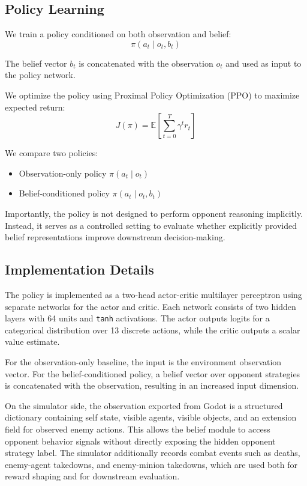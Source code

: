 \documentclass{article}
\begin{document}
\subsection{Policy Learning}

We train a policy conditioned on both observation and belief:
\[
\pi(a_t \mid o_t, b_t)
\]

The belief vector $b_t$ is concatenated with the observation $o_t$ and used as input to the policy network.

We optimize the policy using Proximal Policy Optimization (PPO) to maximize expected return:
\[
J(\pi) = \mathbb{E}\left[\sum_{t=0}^{T} \gamma^t r_t\right]
\]

We compare two policies:
\begin{itemize}
    \item Observation-only policy $\pi(a_t \mid o_t)$
    \item Belief-conditioned policy $\pi(a_t \mid o_t, b_t)$
\end{itemize}

Importantly, the policy is not designed to perform opponent reasoning implicitly. Instead, it serves as a controlled setting to evaluate whether explicitly provided belief representations improve downstream decision-making.

\subsection{Implementation Details}

The policy is implemented as a two-head actor-critic multilayer perceptron using separate networks for the actor and critic. 
Each network consists of two hidden layers with 64 units and \texttt{tanh} activations. 
The actor outputs logits for a categorical distribution over 13 discrete actions, while the critic outputs a scalar value estimate.

For the observation-only baseline, the input is the environment observation vector. 
For the belief-conditioned policy, a belief vector over opponent strategies is concatenated with the observation, resulting in an increased input dimension.

On the simulator side, the observation exported from Godot is a structured dictionary containing self state, visible agents, visible objects, and an extension field for observed enemy actions. This allows the belief module to access opponent behavior signals without directly exposing the hidden opponent strategy label. The simulator additionally records combat events such as deaths, enemy-agent takedowns, and enemy-minion takedowns, which are used both for reward shaping and for downstream evaluation.
\end{document}
